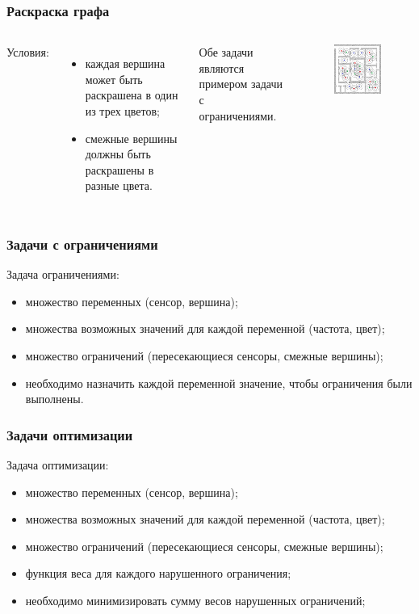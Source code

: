 \documentclass{beamer}
\begin{document}
\begin{frame}
  \frametitle{Раскраска графа}
  \begin{columns}[c]

    Условия:
    \begin{itemize}
      \item каждая вершина может быть раскрашена в один из трех цветов;
      \item смежные вершины должны быть раскрашены в разные цвета.
    \end{itemize}

    Обе задачи являются примером задачи с ограничениями.

    \begin{figure}
       \includegraphics[width=5cm]{images/graph-coloring.jpg}
    \end{figure}
  \end{columns}
\end{frame}

\begin{frame}
  \frametitle{Задачи с ограничениями}
  Задача ограничениями:
  \begin{itemize}
    \item<1-> множество переменных (сенсор, вершина);
    \item<2-> множества возможных значений для каждой переменной (частота, цвет);
    \item<3-> множество ограничений (пересекающиеся сенсоры, смежные вершины);
    \item<4-> необходимо назначить каждой переменной значение, чтобы ограничения были выполнены.
  \end{itemize}
\end{frame}

\begin{frame}
  \frametitle{Задачи оптимизации}
  Задача \alert{оптимизации}:
  \begin{itemize}
    \item<1-> множество переменных (сенсор, вершина);
    \item<1-> множества возможных значений для каждой переменной (частота, цвет);
    \item<1-> множество ограничений (пересекающиеся сенсоры, смежные вершины);
    \item<2-| alert@2> функция веса для каждого нарушенного ограничения;
    \item<3-| alert@3> необходимо минимизировать сумму весов нарушенных ограничений;
  \end{itemize}
\end{frame}
\end{document}

